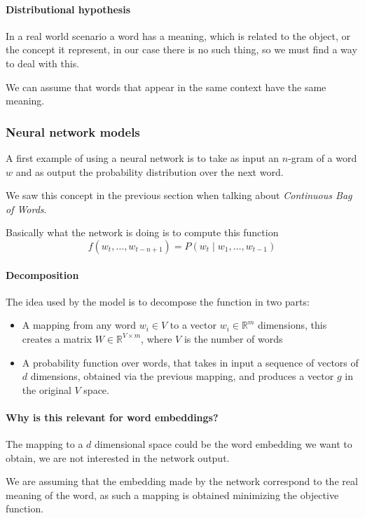 \paragraph{Distributional hypothesis}
In a real world scenario a word has a meaning, which is related 
to the object, or the concept it represent, in our case there is 
no such thing, so we must find a way to deal with this.

We can assume that words that appear in the same 
context have the same meaning.

\subsubsection{Neural network models}

A first example of using a neural network is 
to take as input an $n$-gram of a word $w$ and
as output the probability distribution over the next word.

We saw this concept in the previous section when talking about 
\emph{Continuous Bag of Words}.

Basically what the network is doing is to compute 
this function
$$f(w_t, \dots, w_{t-n+1}) = P(w_t \; | \; w_1, \dots, w_{t-1})$$

\paragraph{Decomposition}
The idea used by the model is to decompose the function in 
two parts:
\begin{itemize}
    \item A mapping from any word $w_i \in V$ to a vector $w_i \in \mathbb{R}^m$ dimensions,
    this creates a matrix $W \in \mathbb{R}^{V \times m}$, where $V$ is the number of words
    \item A probability function over words, that takes in input 
    a sequence of vectors of $d$ dimensions, obtained via the previous
    mapping, and produces a vector $g$ in the original $V$ space.
\end{itemize}

\paragraph{Why is this relevant for word embeddings?}
The mapping to a $d$ dimensional space could be the word 
embedding we want to obtain, we are not interested 
in the network output.

We are assuming that the embedding made by the network 
correspond to the real meaning of the word, as such a 
mapping is obtained minimizing the objective function. 


